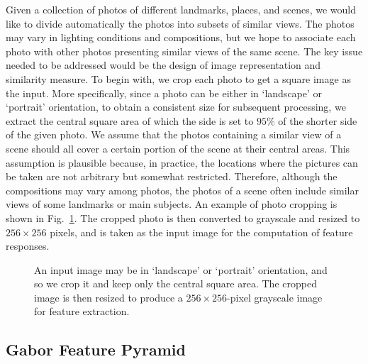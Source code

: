 \documentclass[conference]{IEEEtran}
\begin{document}
Given a collection of photos of different landmarks, places, and scenes, we would like to divide automatically the photos into subsets of similar views. The photos may vary in lighting conditions and compositions, but we hope to associate each photo with other photos presenting similar views of the same scene. The key issue needed to be addressed would be the design of image representation and similarity measure. To begin with, we crop each photo to get a square image as the input. More specifically, since a photo can be either in `landscape' or `portrait' orientation, to obtain a consistent size for subsequent processing, we extract the central square area of which the side is set to $95\%$ of the shorter side of the given photo. We assume that the photos containing a similar view of a scene should all cover a certain portion of the scene at their central areas. This assumption is plausible because, in practice, the locations where the pictures can be taken are not arbitrary but somewhat restricted. Therefore, although the compositions may vary among photos, the photos of a scene often include similar views of some landmarks or main subjects. An example of photo cropping is shown in Fig.~\ref{fig:eecs_img}. The cropped photo is then converted to grayscale and resized to $256\times 256$ pixels, and is taken as the input image for the computation of feature responses.


\begin{figure}
\centering
{}
\caption{An input image may be in `landscape' or `portrait' orientation, and so we crop it and keep only the central square area. The cropped image is then resized to produce a $256\times 256$-pixel grayscale image for feature extraction.}
\label{fig:eecs_img}
\end{figure}

\subsection{Gabor Feature Pyramid}
\end{document}
